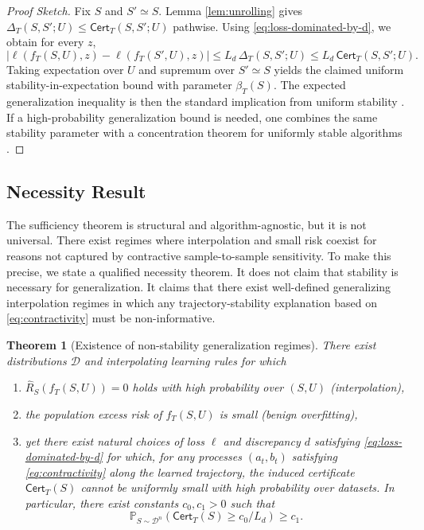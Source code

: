 \documentclass{article}
\newtheorem{theorem}{Theorem}[section]
\numberwithin{equation}{section}
\begin{document}
\begin{proof}[Proof Sketch]
Fix $S$ and $S'\simeq S$.
Lemma \ref{lem:unrolling} gives $\Delta_T(S,S';U)\le \mathsf{Cert}_T(S,S';U)$ pathwise.
Using \eqref{eq:loss-dominated-by-d}, we obtain for every $z$,
\[
|\ell(f_T(S,U),z)-\ell(f_T(S',U),z)|
\le L_d\,\Delta_T(S,S';U)
\le L_d\,\mathsf{Cert}_T(S,S';U).
\]
Taking expectation over $U$ and supremum over $S'\simeq S$ yields the claimed uniform stability-in-expectation bound with parameter $\beta_T(S)$. The expected generalization inequality is then the standard implication from uniform stability \cite{bousquet2002stability}. If a high-probability generalization bound is needed, one combines the same stability parameter with a concentration theorem for uniformly stable algorithms \cite{pmlr-v99-feldman19a}.
\end{proof}

\subsection{Necessity Result}
\label{subsec:necessity}

The sufficiency theorem is structural and algorithm-agnostic, but it is not universal. There exist regimes where interpolation and small risk coexist for reasons not captured by contractive sample-to-sample sensitivity. To make this precise, we state a qualified necessity theorem. It does not claim that stability is necessary for generalization. It claims that there exist well-defined generalizing interpolation regimes in which any trajectory-stability explanation based on \eqref{eq:contractivity} must be non-informative.

\begin{theorem}[Existence of non-stability generalization regimes]
	\label{thm:necessity}
	There exist distributions $\mathcal{D}$ and interpolating learning rules for which
	\begin{enumerate}
		\item $\widehat{R}_S(f_T(S,U))=0$ holds with high probability over $(S,U)$ (interpolation),
		\item the population excess risk of $f_T(S,U)$ is small (benign overfitting),
		\item yet there exist natural choices of loss $\ell$ and discrepancy $d$ satisfying \eqref{eq:loss-dominated-by-d} for which, for any processes $(a_t,b_t)$ satisfying \eqref{eq:contractivity} along the learned trajectory, the induced certificate $\mathsf{Cert}_T(S)$ cannot be uniformly small with high probability over datasets. In particular, there exist constants $c_0,c_1>0$ such that
		\[
		\mathbb{P}_{S\sim \mathcal{D}^n}\!\left(\mathsf{Cert}_T(S)\ge c_0/L_d\right)\ge c_1.
		\]
	\end{enumerate}
\end{theorem}
\end{document}
